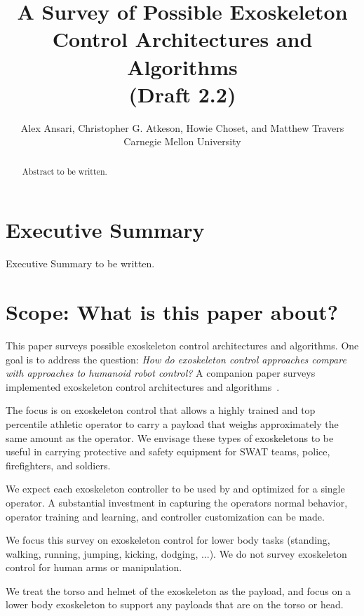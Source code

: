 \documentclass[letterpaper,12pt,fullpage]{article}
\begin{document}
\title{A Survey of Possible Exoskeleton Control Architectures and
Algorithms\\
(Draft 2.2)}

\author{Alex Ansari, Christopher G. Atkeson, Howie Choset, and Matthew Travers\\
Carnegie Mellon University}

\maketitle

\begin{abstract}
Abstract to be written.
\end{abstract}

\section{Executive Summary}

Executive Summary to be written.

\section{Scope: What is this paper about?}

This paper surveys possible exoskeleton control architectures and
algorithms.
One goal is to address the question:
{\it How do exoskeleton control approaches compare with 
approaches to humanoid robot control?}
A companion paper surveys implemented exoskeleton control architectures
and algorithms~\cite{}.

The focus is on exoskeleton control that allows a
highly trained and top percentile athletic 
operator to carry a payload that weighs approximately the same amount
as the operator. We envisage these types of exoskeletons to be useful
in carrying protective and safety equipment for SWAT teams, police,
firefighters, and soldiers. 

We expect each exoskeleton controller
to be used by and optimized for a single operator.
A substantial investment in capturing the operators normal behavior,
operator training and learning, and controller customization can be made.

We focus this survey on exoskeleton control for lower body tasks (standing, walking,
running, jumping, kicking, dodging, ...).
We do not survey exoskeleton control for human arms or manipulation. 

We treat the torso and helmet of the exoskeleton as the payload,
and focus on a lower body exoskeleton to support any payloads that
are on the torso or head.
\end{document}
